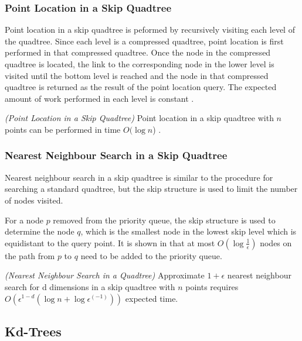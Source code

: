 \documentclass[mcs]{scsthesis}
\begin{document}
\subsubsection{Point Location in a Skip Quadtree}

Point location in a skip quadtree is peformed by recursively visiting each level
of the quadtree. Since each level is a compressed quadtree, point location is
first performed in that compressed quadtree. Once the node in the compressed
quadtree is located, the link to the corresponding node in the lower level
is visited until the bottom level is reached and the node in that compressed
quadtree is returned as the result of the point location query. The expected
amount of work performed in each level is constant \cite{skipquadtree}.

\begin{thm} \emph{(Point Location in a Skip Quadtree)} 
Point location in a skip quadtree with $n$ points can be performed in time
\(O(\log n\)) \cite{skipquadtree}. 
\end{thm}

\subsubsection{Nearest Neighbour Search in a Skip Quadtree}

Nearest neighbour search in a skip quadtree is similar to the procedure for
searching a standard quadtree, but the skip structure is used to limit
the number of nodes visited.

For a node \(p\) removed from the priority queue, the skip structure is used to
determine the node \(q\), which is the smallest node in the lowest skip level
which is equidistant to the query point. It is shown in \cite{skipquadtree}
that at most \(O(\log \frac{1}{\epsilon})\) nodes on the path from \(p\) to \(q\)
need to be added to the priority queue.

\begin{thm} \emph{(Nearest Neighbour Search in a Quadtree)} 
Approximate \(1 + \epsilon\) nearest neighbour search for d dimensions in a skip
quadtree with $n$ points requires
\(O(\epsilon^{1 - d}(\log n + \log \epsilon^(-1)))\) expected time.
\end{thm}

\subsection{Kd-Trees}
\end{document}
